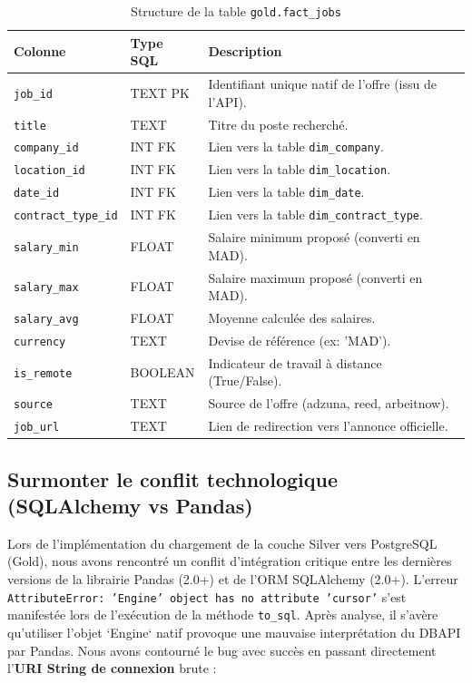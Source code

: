 \documentclass[12pt,a4paper,twoside]{report}
\begin{document}
\begin{table}[H]
    \centering
    \begin{tabularx}{\textwidth}{|l|l|X|}
        \hline
        \textbf{Colonne} & \textbf{Type SQL} & \textbf{Description} \\
        \hline
        \texttt{job\_id} & TEXT PK & Identifiant unique natif de l'offre (issu de l'API). \\
        \texttt{title} & TEXT & Titre du poste recherché. \\
        \texttt{company\_id} & INT FK & Lien vers la table \texttt{dim\_company}. \\
        \texttt{location\_id}& INT FK & Lien vers la table \texttt{dim\_location}. \\
        \texttt{date\_id} & INT FK & Lien vers la table \texttt{dim\_date}. \\
        \texttt{contract\_type\_id}& INT FK & Lien vers la table \texttt{dim\_contract\_type}. \\
        \texttt{salary\_min} & FLOAT & Salaire minimum proposé (converti en MAD). \\
        \texttt{salary\_max} & FLOAT & Salaire maximum proposé (converti en MAD). \\
        \texttt{salary\_avg} & FLOAT & Moyenne calculée des salaires. \\
        \texttt{currency} & TEXT & Devise de référence (ex: 'MAD'). \\
        \texttt{is\_remote} & BOOLEAN & Indicateur de travail à distance (True/False). \\
        \texttt{source} & TEXT & Source de l'offre (adzuna, reed, arbeitnow). \\
        \texttt{job\_url} & TEXT & Lien de redirection vers l'annonce officielle. \\
        \hline
    \end{tabularx}
    \caption{Structure de la table \texttt{gold.fact\_jobs}}
\end{table}

\subsection{Surmonter le conflit technologique (SQLAlchemy vs Pandas)}
Lors de l'implémentation du chargement de la couche Silver vers PostgreSQL (Gold), nous avons rencontré un conflit d'intégration critique entre les dernières versions de la librairie Pandas (2.0+) et de l'ORM SQLAlchemy (2.0+). 
L'erreur \texttt{AttributeError: 'Engine' object has no attribute 'cursor'} s'est manifestée lors de l'exécution de la méthode \texttt{to\_sql}. Après analyse, il s'avère qu'utiliser l'objet `Engine` natif provoque une mauvaise interprétation du DBAPI par Pandas. Nous avons contourné le bug avec succès en passant directement l'\textbf{URI String de connexion} brute :
\end{document}

